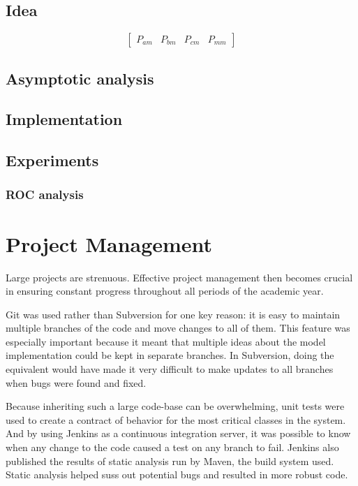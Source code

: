 \documentclass[11pt, a4paper]{report}
\begin{document}
\section{Idea}

%
%
\[
\begin{bmatrix}
  P_{am} & P_{bm} & P_{cm} & P_{mm}
\end{bmatrix}
\]

\section{Asymptotic analysis}
\section{Implementation}
\section{Experiments}
\subsection{ROC analysis}

\chapter{Project Management}
\label{cha:project-management}
Large projects are strenuous. Effective project management then
becomes crucial in ensuring constant progress throughout all periods
of the academic year.

Git was used rather than Subversion for one key reason: it is easy to
maintain multiple branches of the code and move changes to all of
them. This feature was especially important because it meant that
multiple ideas about the model implementation could be kept in
separate branches. In Subversion, doing the equivalent would have made
it very difficult to make updates to all branches when bugs were found
and fixed.

Because inheriting such a large code-base can be overwhelming, unit
tests were used to create a contract of behavior for the most critical
classes in the system. And by using Jenkins as a continuous
integration server, it was possible to know when any change to the
code caused a test on any branch to fail. Jenkins also published the
results of static analysis run by Maven, the build system used. Static
analysis helped suss out potential bugs and resulted in more robust code.
\end{document}
